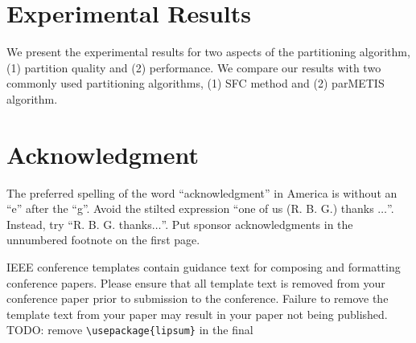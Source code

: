 \documentclass[conference]{IEEEtran}
\begin{document}

\section{Experimental Results}
We present the experimental results for two aspects of the partitioning algorithm, (1) partition quality and (2) performance. We compare our results with two commonly used partitioning algorithms, (1) SFC method and (2) parMETIS algorithm.



\section*{Acknowledgment}

The preferred spelling of the word ``acknowledgment'' in America is without 
an ``e'' after the ``g''. Avoid the stilted expression ``one of us (R. B. 
G.) thanks $\ldots$''. Instead, try ``R. B. G. thanks$\ldots$''. Put sponsor 
acknowledgments in the unnumbered footnote on the first page.






\vspace{12pt}
\color{red}
IEEE conference templates contain guidance text for composing and formatting conference papers. Please ensure that all template text is removed from your conference paper prior to submission to the conference. Failure to remove the template text from your paper may result in your paper not being published.
\\
TODO: remove \verb|\usepackage{lipsum}| in the final
\end{document}
